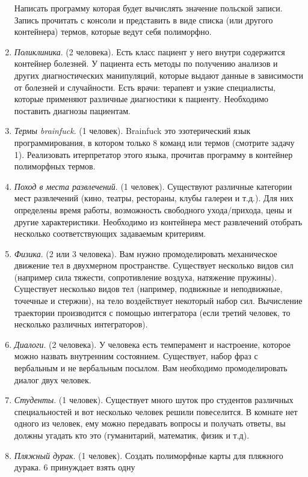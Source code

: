 \documentclass[12pt]{report}
\begin{document}
\begin{enumerate}
  Написать программу которая будет вычислять значение польской записи. Запись прочитать с консоли и представить в виде списка
  (или другого контейнера) термов, которые ведут себя полиморфно.
  \item \emph{Поликлиника}. (2 человека). Есть класс пациент у него внутри содержится контейнер болезней. У пациента есть 
  методы по получению   анализов и других диагностических манипуляций, которые выдают данные в зависимости от болезней и
  случайности. Есть врачи: терапевт и узкие специалисты, которые применяют различные диагностики к пациенту. 
  Необходимо поставить диагнозы пациентам.
  \item \emph{Термы brainfuck}. (1 человек). Brainfuck это эзотерический язык программирования, в котором только 8 
  команд или термов (смотрите задачу 1). Реализовать итерпретатор этого языка, прочитав программу в контейнер полиморфных
  термов.
  \item \emph{Поход в места развлечений}. (1 человек). Существуют различные категории мест развлечений (кино, театры, 
рестораны, клубы
   галереи и т.д.). Для них определены время работы, возможность свободного ухода/прихода, цены и другие характеристики.
   Необходимо из контейнера мест развлечений отобрать несколько соответствующих задаваемым критериям.
  \item \emph{Физика}. (2 или 3 человека). Вам нужно промоделировать механическое движение тел в двухмерном пространстве. 
  Существует несколько
  видов сил (например сила тяжести, сопротивление воздуха, натяжение пружины). Существует несколько видов тел (например,
  подвижные и неподвижные, точечные и стержни), на тело воздействует некоторый набор сил. Вычисление траектории производится с
  помощью интегратора (если третий человек, то несколько различных интеграторов).
  \item \emph{Диалоги}. (2 человека). У человека есть темперамент и настроение, 
которое можно назвать  внутренним состоянием. Существует,
  набор фраз с вербальным и не вербальным посылом. Вам необходимо промоделировать диалог двух человек. 
  \item \emph{Студенты}. (1 человек). Существует много шуток про студентов различных специальностей и вот несколько человек решили
  повеселится. В комнате нет одного из человек, ему можно передавать вопросы и получать ответы, вы должны угадать кто это 
  (гуманитарий, математик, физик и т.д).
  \item \emph{Пляжный дурак}. (1 человек). Создать полиморфные карты для пляжного дурака. 6 принуждает взять одну 

\end{enumerate}
\end{document}
